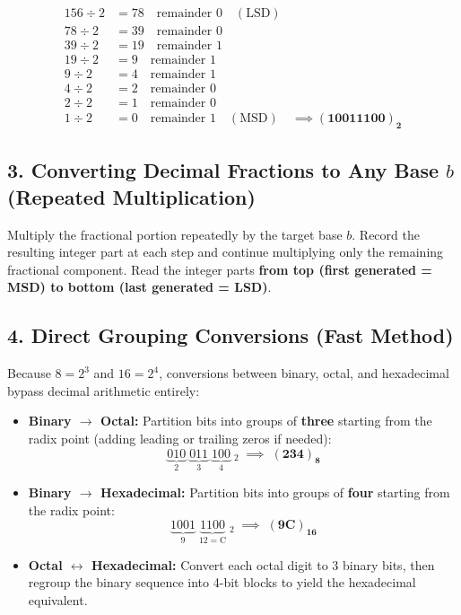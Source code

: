 \begin{example}
\begin{align*}
156 \div 2 &= 78 \quad \text{remainder } 0 \quad (\text{LSD}) \\
78 \div 2  &= 39 \quad \text{remainder } 0 \\
39 \div 2  &= 19 \quad \text{remainder } 1 \\
19 \div 2  &= 9 \quad \text{remainder } 1 \\
9 \div 2   &= 4 \quad \text{remainder } 1 \\
4 \div 2   &= 2 \quad \text{remainder } 0 \\
2 \div 2   &= 1 \quad \text{remainder } 0 \\
1 \div 2   &= 0 \quad \text{remainder } 1 \quad (\text{MSD}) \quad \implies \mathbf{(10011100)_2}
\end{align*}
\end{example}

\subsection{3. Converting Decimal Fractions to Any Base $b$ (Repeated Multiplication)}
Multiply the fractional portion repeatedly by the target base $b$. Record the resulting integer part at each step and continue multiplying only the remaining fractional component. Read the integer parts \textbf{from top (first generated = MSD) to bottom (last generated = LSD)}.

\subsection{4. Direct Grouping Conversions (Fast Method)}
Because $8 = 2^3$ and $16 = 2^4$, conversions between binary, octal, and hexadecimal bypass decimal arithmetic entirely:
\begin{itemize}[leftmargin=1.2em]
    \item \textbf{Binary $\rightarrow$ Octal:} Partition bits into groups of \textbf{three} starting from the radix point (adding leading or trailing zeros if needed):
    \[
    \underbrace{010}_{2}\;\underbrace{011}_{3}\;\underbrace{100}_{4}\;_2 \;\implies\; \mathbf{(234)_8}
    \]
    \item \textbf{Binary $\rightarrow$ Hexadecimal:} Partition bits into groups of \textbf{four} starting from the radix point:
    \[
    \underbrace{1001}_{9}\;\underbrace{1100}_{12=\text{C}}\;_2 \;\implies\; \mathbf{(9\text{C})_{16}}
    \]
    \item \textbf{Octal $\leftrightarrow$ Hexadecimal:} Convert each octal digit to 3 binary bits, then regroup the binary sequence into 4-bit blocks to yield the hexadecimal equivalent.
\end{itemize}


